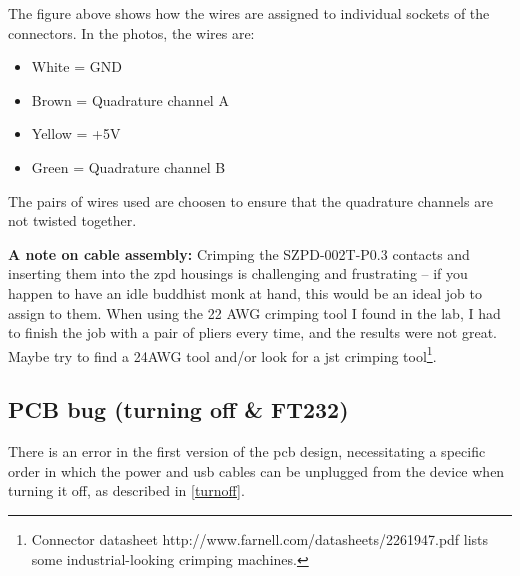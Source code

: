 \documentclass[twoside]{article}
\begin{document}
The figure above shows how the wires are assigned to individual sockets of the connectors. In the photos, the wires are: 

\begin{itemize}
\item White = GND
\item Brown = Quadrature channel A
\item Yellow = +5V
\item Green = Quadrature channel B
\end{itemize}

The pairs of wires used are choosen to ensure that the quadrature channels are not twisted together.

\noindent\textbf{A note on cable assembly:} Crimping the SZPD-002T-P0.3 contacts and inserting them into the zpd housings is challenging and frustrating -- if you happen to have an idle buddhist monk at hand, this would be an ideal job to assign to them. When using the 22 AWG crimping tool I found in the lab, I had to finish the job with a pair of pliers every time, and the results were not great. Maybe try to find a 24AWG tool and/or look for a jst crimping tool\footnote{Connector datasheet http://www.farnell.com/datasheets/2261947.pdf lists some industrial-looking crimping machines.}.


\subsection{PCB bug (turning off & FT232)}
\label{hwbug}

There is an error in the first version of the pcb design, necessitating a specific order in which the power and usb cables can be unplugged from the device when turning it off, as described in \ref{turnoff}. 
\end{document}
